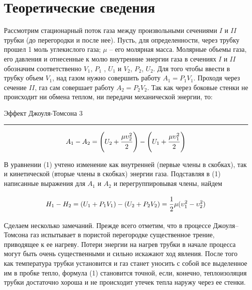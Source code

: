 \documentclass[12pt,a4paper]{scrartcl}
\begin{document}
	\section{Теоретические сведения}
	Рассмотрим стационарный поток газа между произвольными сечениями $I$ и $II$ трубки (до перегородки и после нее). Пусть, для определенности, через трубку прошел 1 моль углекислого газа; $\mu$ -- его
	молярная масса. Молярные объемы газа, его давления и отнесенные	к молю внутренние энергии газа в сечениях $I$ и $II$ обозначим соответственно $V_1$, $P_1$ , $U_1$ и $V_2$, $P_2$, $U_2$. Для того чтобы ввести в трубку объем $V_1$, над газом нужно совершить работу $A_1 = P_1 V_1$. Проходя через сечение $II$, газ сам совершает работу $A_2 = P_2 V_2$. Так как через боковые стенки не происходит ни обмена теплом, ни передачи механической энергии, то:
	
	\newpage 
	
	
	\begin{flushleft}
		\footnotesize{Эффект Джоуля-Томсона} \hspace{\fill} \footnotesize{3}
		\\[-0.3cm]\noindent\rule{\textwidth}{0.3pt}
	\end{flushleft}
	
	\begin{equation}
		A_1 - A_2 = \left(U_2 + \dfrac{\strut \mu\upsilon_2^2}{\strut 2}\right) - \left(U_1 + \dfrac{\strut \mu \upsilon_1^2}{\strut 2}\right)
	\end{equation}
	
	В уравнении (1) учтено изменение как внутренней (первые члены в	скобках), так и кинетической (вторые члены в скобках) энергии газа. Подставляя в (1) написанные выражения для $A_1$ и $A_2$ и перегруппировывая члены, найдем
	
	\begin{equation}
		H_1 - H_2 = (U_1 + P_1V_1) - (U_2 + P_2V_2) = \dfrac{\strut 1}{\strut 2}\mu(\upsilon_1^2 - \upsilon_2^2)
	\end{equation}
	
	Сделаем несколько замечаний. Прежде всего отметим, что в процессе Джоуля–Томсона газ испытывает в пористой перегородке существенное трение, приводящее к ее нагреву. Потери энергии на нагрев	трубки в начале процесса могут быть очень существенными и сильно	искажают ход явления. После того как температура трубки установится и газ станет уносить с собой все выделенное им в пробке тепло, формула (1) становится точной, если, конечно, теплоизоляция трубки достаточно хороша и не происходит утечек тепла наружу через ее стенки.
	
\end{document}
